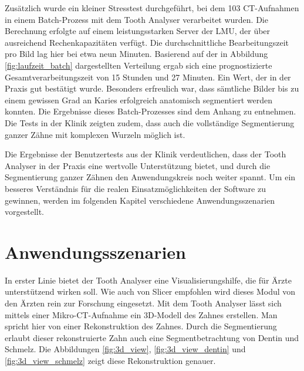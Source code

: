 Zusätzlich wurde ein kleiner Stresstest durchgeführt, bei dem 103 \ac{CT}-Aufnahmen
in einem Batch-Prozess mit dem Tooth Analyser verarbeitet wurden. Die Berechnung
erfolgte auf einem leistungsstarken Server der LMU, der über ausreichend Rechenkapazitäten
verfügt. Die durchschnittliche Bearbeitungszeit pro Bild lag hier bei etwa neun
Minuten. Basierend auf der in Abbildung \ref{fig:laufzeit_batch} dargestellten Verteilung
ergab sich eine prognostizierte Gesamtverarbeitungszeit von 15 Stunden und 27 Minuten.
Ein Wert, der in der Praxis gut bestätigt wurde. Besonders erfreulich war, dass sämtliche
Bilder bis zu einem gewissen Grad an Karies erfolgreich anatomisch segmentiert werden
konnten. Die Ergebnisse dieses Batch-Prozesses sind dem Anhang zu entnehmen. Die
Tests in der Klinik zeigten zudem, dass auch die vollständige Segmentierung
ganzer Zähne mit komplexen Wurzeln möglich ist.

Die Ergebnisse der Benutzertests aus der Klinik verdeutlichen, dass der Tooth Analyser
in der Praxis eine wertvolle Unterstützung bietet, und durch die Segmentierung
ganzer Zähnen den Anwendungskreis noch weiter spannt. Um ein besseres Verständnis
für die realen Einsatzmöglichkeiten der Software zu gewinnen, werden im
folgenden Kapitel verschiedene Anwendungsszenarien vorgestellt.

\section{Anwendungsszenarien}
In erster Linie bietet der Tooth Analyser eine Visualisierungshilfe, die für Ärzte
unterstützend wirken soll. Wie auch von Slicer empfohlen wird dieses Modul von
den Ärzten rein zur Forschung eingesetzt. Mit dem Tooth Analyser lässt sich mittels
einer Mikro-\ac{CT}-Aufnahme ein \ac{3D}-Modell des Zahnes erstellen. Man
spricht hier von einer Rekonstruktion des Zahnes. Durch die Segmentierung erlaubt
dieser rekonstruierte Zahn auch eine Segmentbetrachtung von Dentin und Schmelz.
Die Abbildungen \ref{fig:3d_view}, \ref{fig:3d_view_dentin} und \ref{fig:3d_view_schmelz}
zeigt diese Rekonstruktion genauer.

